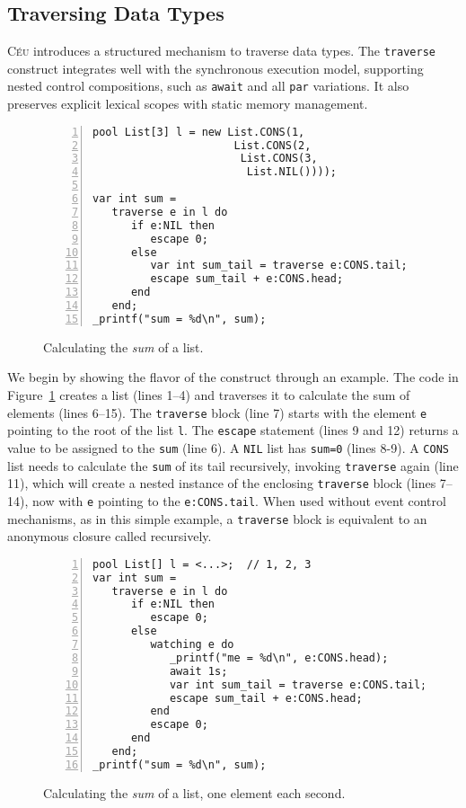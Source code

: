 \documentclass{acm_proc_article-sp}
\newcommand{\CEU}{\textsc{C\'{e}u}\xspace}
\newcommand{\code}[1] {{\small{\texttt{#1}}}}
\begin{document}
\subsection{Traversing Data Types}
\label{sec.traverse}

\CEU introduces a structured mechanism to traverse data types.
The \code{traverse} construct integrates well with the synchronous execution 
model, supporting nested control compositions, such as \code{await} and all 
\code{par} variations.
It also preserves explicit lexical scopes with static memory management.

\begin{figure}%
\begin{lstlisting}[numbers=left,xleftmargin=3em]
pool List[3] l = new List.CONS(1,
                      List.CONS(2,
                       List.CONS(3,
                        List.NIL())));

var int sum =
   traverse e in l do
      if e:NIL then
         escape 0;
      else
         var int sum_tail = traverse e:CONS.tail;
         escape sum_tail + e:CONS.head;
      end
   end;
_printf("sum = %d\n", sum);
\end{lstlisting}
\caption{
Calculating the \emph{sum} of a list.
\label{lst.sum}
}
\end{figure}

We begin by showing the flavor of the construct through an example.
The code in Figure~\ref{lst.sum} creates a list (lines 1--4) and traverses 
it to calculate the sum of elements (lines 6--15).
The \code{traverse} block (line 7) starts with the element \code{e} pointing to 
the root of the list \code{l}.
The \code{escape} statement (lines 9 and 12) returns a value to be assigned to 
the \code{sum} (line 6).
A \code{NIL} list has \code{sum=0} (lines 8-9).
A \code{CONS} list needs to calculate the \code{sum} of its tail recursively, 
invoking \code{traverse} again (line 11), which will create a nested instance 
of the enclosing \code{traverse} block (lines 7--14), now with \code{e} 
pointing to the \code{e:CONS.tail}.
When used without event control mechanisms, as in this simple example,
a \code{traverse} block is equivalent to an anonymous closure called recursively.

\begin{figure}%
\begin{lstlisting}[numbers=left,xleftmargin=3em]
pool List[] l = <...>;  // 1, 2, 3
var int sum =
   traverse e in l do
      if e:NIL then
         escape 0;
      else
         watching e do
            _printf("me = %d\n", e:CONS.head);
            await 1s;
            var int sum_tail = traverse e:CONS.tail;
            escape sum_tail + e:CONS.head;
         end
         escape 0;
      end
   end;
_printf("sum = %d\n", sum);
\end{lstlisting}
\caption{
Calculating the \emph{sum} of a list, one element each second.
\label{lst.sum.react}
}
\end{figure}
\end{document}
